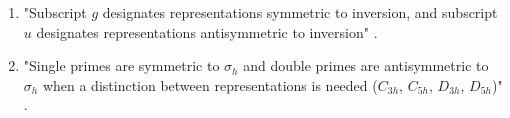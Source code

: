 \documentclass[../notes.tex]{subfiles}
\begin{document}
\begin{itemize}
\begin{enumerate}
        \item "Subscript $g$ designates representations symmetric to inversion, and subscript $u$ designates representations antisymmetric to inversion" \parencite[100]{bib:MiesslerFischerTarr}.
        \item "Single primes are symmetric to $\sigma_h$ and double primes are antisymmetric to $\sigma_h$ when a distinction between representations is needed ($C_{3h}$, $C_{5h}$, $D_{3h}$, $D_{5h}$)" \parencite[100]{bib:MiesslerFischerTarr}.
    \end{enumerate}
\end{itemize}
\end{document}
